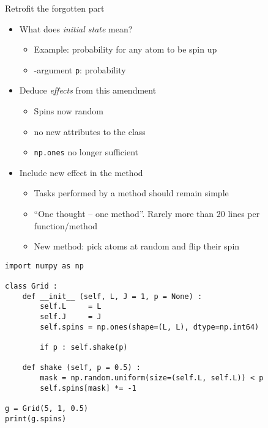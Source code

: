 
\begin{frame}[fragile]{Retrofit the forgotten part}
%
\begin{itemize}
\item What does \emph{initial state} mean?
	\begin{itemize}
	\item Example: probability for any atom to be spin up
	\item[\Thus] -argument \texttt{p}: probability
	\end{itemize}
\item Deduce \emph{effects} from this amendment
	\begin{itemize}
	\item Spins now random
	\item[\Thus] no new attributes to the class
	\item[\Thus] \texttt{np.ones} no longer sufficient
	\end{itemize}
\item Include new effect in the method
	\begin{itemize}
	\item Tasks performed by a method should remain simple
	\item \enquote{One thought -- one method}. Rarely more than 20 lines per function/method
	\item New method: pick atoms at random and flip their spin
	\end{itemize}
\end{itemize}
%
\end{frame}


\begin{frame}[fragile]
%
\begin{codebox}
\begin{verbatim}
import numpy as np

class Grid :
    def __init__ (self, L, J = 1, p = None) :
        self.L     = L
        self.J     = J
        self.spins = np.ones(shape=(L, L), dtype=np.int64)
        
        if p : self.shake(p)
        
    def shake (self, p = 0.5) :
        mask = np.random.uniform(size=(self.L, self.L)) < p
        self.spins[mask] *= -1

g = Grid(5, 1, 0.5)
print(g.spins)
\end{verbatim}
\end{codebox}
%
\end{frame}

